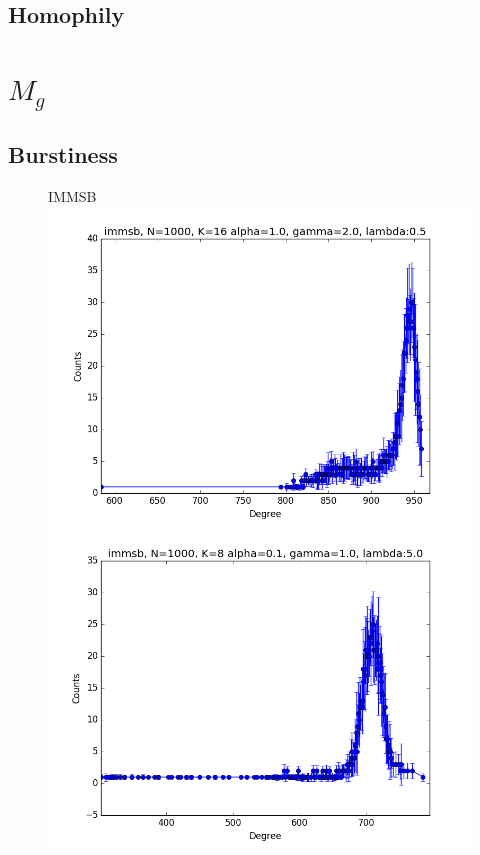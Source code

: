 \documentclass[a4paper, 12pt]{article}
\begin{document}
\subsection{Homophily}

\section{$M_g$}

\subsection{Burstiness}


\begin{figure}[ht]
    \vspace{-3cm}
	\centering IMMSB\\
	\includegraphics[scale=0.27]{img/M_g_peaks/figure_1}
	\endminipage
	\includegraphics[scale=0.27]{img/M_g_power_law/figure_1}

\end{figure}
\end{document}
